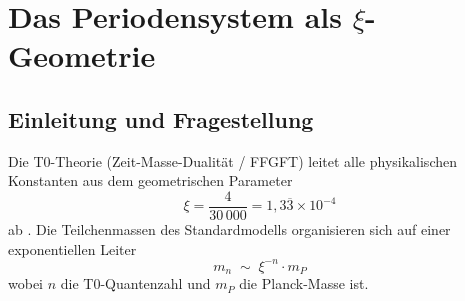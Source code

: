 
\chapter{Das Periodensystem als \texorpdfstring{$\xi$}{xi}-Geometrie}
\label{chap:periodensystem-xi}

\begin{abstract}
Das Periodensystem der Elemente und die Teilchenmassen-Leiter der T0-Theorie
teilen dieselbe geometrische Quantenzahl~$n$, jedoch in verschiedenen Rollen.
Die Teilchenmassen folgen einer \emph{radialen} exponentiellen Skalierung
$m_n \sim \xi^{-n} \cdot m_P$, während die Schalenstruktur des Periodensystems
einer \emph{angularen} quadratischen Entartung $g_n = 2n^2$ gehorcht.
Beide entstehen aus der dreidimensionalen Gittergeometrie der T0-Theorie:
$\xi$ ist das Packungsdefizit des 3D-Gitters (radiale Richtung),
$2n^2$ ist der Entartungsgrad der $n$-ten Kugelschale im selben Gitter
(angulare Richtung).
Die Rydberg-Energie liegt exakt auf Stufe~7 der $\xi$-Potenzleiter:
$R_\infty = \frac{m_e \alpha^2}{2} \approx \xi^{6{,}956} \cdot E_P$.
Das Dualitätsprinzip $E_n \cdot g_n = 2R_\infty = \text{const}$
verbindet die $1/n^2$-Energieleiter mit der $n^2$-Füllleiter
und ist eine geometrische Äquipartition.
Das Periodensystem ist der angulare Querschnitt der $\xi$-Geometrie
auf Stufe $\xi^{\sim 7}$ — analog dazu sind die Leptonmassen der radiale
Querschnitt auf den Stufen $\xi^{4{,}9}$ bis $\xi^{5{,}8}$.
\end{abstract}

\section{Einleitung und Fragestellung}
\label{sec:ps-einleitung}

Die T0-Theorie (Zeit-Masse-Dualität / FFGFT) leitet alle physikalischen
Konstanten aus dem geometrischen Parameter
\begin{equation}
  \xi = \frac{4}{30\,000} = 1{,}3\overline{3} \times 10^{-4}
\end{equation}
ab \cite{dok009,dok041,dok056}.
Die Teilchenmassen des Standardmodells organisieren sich auf einer
exponentiellen Leiter
\begin{equation}
  m_n \;\sim\; \xi^{-n} \cdot m_P
  \label{eq:massenleiter}
\end{equation}
wobei $n$ die T0-Quantenzahl und $m_P$ die Planck-Masse ist.


